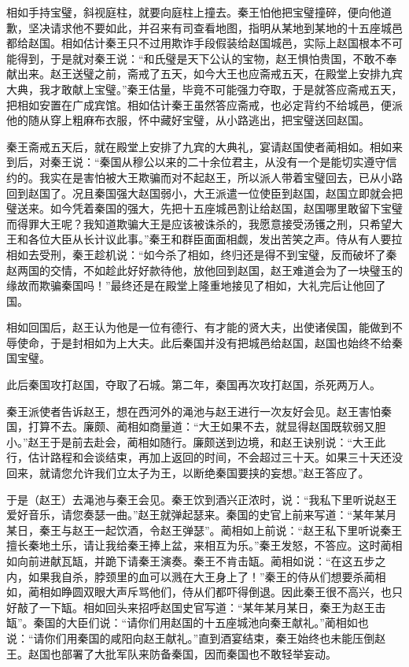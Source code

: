 \documentclass[12pt,UTF-8,openany]{ctexbook}
\begin{document}
\begin{normalsize}
    相如手持宝璧，斜视庭柱，就要向庭柱上撞去。秦王怕他把宝璧撞碎，便向他道歉，坚决请求他不要如此，并召来有司查看地图，指明从某地到某地的十五座城邑都给赵国。相如估计秦王只不过用欺诈手段假装给赵国城邑，实际上赵国根本不可能得到，于是就对秦王说：“和氏璧是天下公认的宝物，赵王惧怕贵国，不敢不奉献出来。赵王送璧之前，斋戒了五天，如今大王也应斋戒五天，在殿堂上安排九宾大典，我才敢献上宝璧。”秦王估量，毕竟不可能强力夺取，于是就答应斋戒五天，把相如安置在广成宾馆。相如估计秦王虽然答应斋戒，也必定背约不给城邑，便派他的随从穿上粗麻布衣服，怀中藏好宝璧，从小路逃出，把宝璧送回赵国。
    
    秦王斋戒五天后，就在殿堂上安排了九宾的大典礼，宴请赵国使者蔺相如。相如来到后，对秦王说：“秦国从穆公以来的二十余位君主，从没有一个是能切实遵守信约的。我实在是害怕被大王欺骗而对不起赵王，所以派人带着宝璧回去，已从小路回到赵国了。况且秦国强大赵国弱小，大王派遣一位使臣到赵国，赵国立即就会把璧送来。如今凭着秦国的强大，先把十五座城邑割让给赵国，赵国哪里敢留下宝璧而得罪大王呢？我知道欺骗大王是应该被诛杀的，我愿意接受汤镬之刑，只希望大王和各位大臣从长计议此事。”秦王和群臣面面相觑，发出苦笑之声。侍从有人要拉相如去受刑，秦王趁机说：“如今杀了相如，终归还是得不到宝璧，反而破坏了秦赵两国的交情，不如趁此好好款待他，放他回到赵国，赵王难道会为了一块璧玉的缘故而欺骗秦国吗！”最终还是在殿堂上隆重地接见了相如，大礼完后让他回了国。
    
    相如回国后，赵王认为他是一位有德行、有才能的贤大夫，出使诸侯国，能做到不辱使命，于是封相如为上大夫。此后秦国并没有把城邑给赵国，赵国也始终不给秦国宝璧。
    
    此后秦国攻打赵国，夺取了石城。第二年，秦国再次攻打赵国，杀死两万人。
    
    秦王派使者告诉赵王，想在西河外的渑池与赵王进行一次友好会见。赵王害怕秦国，打算不去。廉颇、蔺相如商量道：“大王如果不去，就显得赵国既软弱又胆小。”赵王于是前去赴会，蔺相如随行。廉颇送到边境，和赵王诀别说：“大王此行，估计路程和会谈结束，再加上返回的时间，不会超过三十天。如果三十天还没回来，就请您允许我们立太子为王，以断绝秦国要挟的妄想。”赵王答应了。
    
    于是（赵王）去渑池与秦王会见。秦王饮到酒兴正浓时，说：“我私下里听说赵王爱好音乐，请您奏瑟一曲。”赵王就弹起瑟来。秦国的史官上前来写道：“某年某月某日，秦王与赵王一起饮酒，令赵王弹瑟”。蔺相如上前说：“赵王私下里听说秦王擅长秦地土乐，请让我给秦王捧上盆，来相互为乐。”秦王发怒，不答应。这时蔺相如向前进献瓦缻，并跪下请秦王演奏。秦王不肯击缻。蔺相如说：“在这五步之内，如果我自杀，脖颈里的血可以溅在大王身上了！”秦王的侍从们想要杀蔺相如，蔺相如睁圆双眼大声斥骂他们，侍从们都吓得倒退。因此秦王很不高兴，也只好敲了一下缻。相如回头来招呼赵国史官写道：“某年某月某日，秦王为赵王击缻”。秦国的大臣们说：“请你们用赵国的十五座城池向秦王献礼。”蔺相如也说：“请你们用秦国的咸阳向赵王献礼。”直到酒宴结束，秦王始终也未能压倒赵王。赵国也部署了大批军队来防备秦国，因而秦国也不敢轻举妄动。
    

\end{normalsize}
\end{document}
